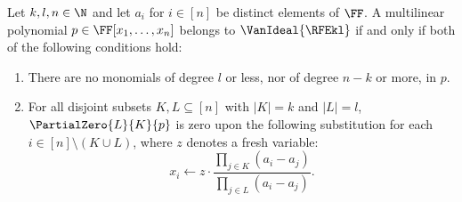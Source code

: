 \begin{theorem}\label{thm.ideal.membership}
  Let $k, l, n \in \N$ and let $a_i$ for $i \in [n]$ be distinct elements of $\FF$.
  A multilinear polynomial $p \in \FF[x_1,\dots,x_n]$ belongs to
  $\VanIdeal{\RFEkl}$ if and only if both of the following conditions hold:
  \begin{enumerate}
    \item\label{thm.ideal.membership.cond1}
      There are no monomials of degree $l$ or less,
      nor of degree $n-k$ or more, in \(p\).
    \item\label{thm.ideal.membership.cond2}
      For all disjoint subsets $K,L \subseteq [n]$ with $|K|=k$ and $|L|=l$,
      $\PartialZero{L}{K}{p}$ is zero upon the following
      substitution for each \(i\in[n]\setminus (K\cup L)\), where $z$ denotes a fresh variable:
      \begin{equation}\label{eq.thm.ideal.membership.sub}
        x_i \gets z\cdot \frac%
          { \prod_{j \in K} (a_i - a_{j}) }%
          { \prod_{j \in L} (a_i - a_{j}) }.
      \end{equation}
  \end{enumerate}
\end{theorem}